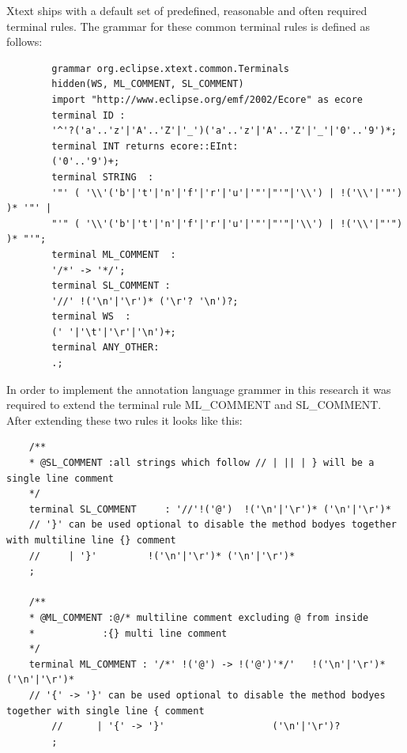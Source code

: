 Xtext ships with a default set of predefined, reasonable and often required terminal rules. The grammar for these common terminal rules is defined as follows:
	\begin{lstlisting}
		grammar org.eclipse.xtext.common.Terminals 
		hidden(WS, ML_COMMENT, SL_COMMENT)
		import "http://www.eclipse.org/emf/2002/Ecore" as ecore
		terminal ID : 
		'^'?('a'..'z'|'A'..'Z'|'_')('a'..'z'|'A'..'Z'|'_'|'0'..'9')*;
		terminal INT returns ecore::EInt: 
		('0'..'9')+;
		terminal STRING  : 
		'"' ( '\\'('b'|'t'|'n'|'f'|'r'|'u'|'"'|"'"|'\\') | !('\\'|'"') )* '"' |
		"'" ( '\\'('b'|'t'|'n'|'f'|'r'|'u'|'"'|"'"|'\\') | !('\\'|"'") )* "'"; 
		terminal ML_COMMENT  : 
		'/*' -> '*/';
		terminal SL_COMMENT : 
		'//' !('\n'|'\r')* ('\r'? '\n')?;
		terminal WS  : 
		(' '|'\t'|'\r'|'\n')+;
		terminal ANY_OTHER: 
		.;
	\end{lstlisting}

In order to implement the annotation language grammer in this research it was required to extend the terminal rule ML\_COMMENT and SL\_COMMENT. After extending these two rules it looks like this:

\begin{lstlisting}
	/**
	* @SL_COMMENT :all strings which follow // | || | } will be a single line comment
	*/ 
	terminal SL_COMMENT 	: '//'!('@')  !('\n'|'\r')* ('\n'|'\r')*
	// '}' can be used optional to disable the method bodyes together with multiline line {} comment 
	//     | '}'         !('\n'|'\r')* ('\n'|'\r')*               
	;
	
	/**
	* @ML_COMMENT :@/* multiline comment excluding @ from inside
	*            :{} multi line comment 
	*/ 
	terminal ML_COMMENT	: '/*' !('@') -> !('@')'*/'   !('\n'|'\r')* ('\n'|'\r')*   
	// '{' -> '}' can be used optional to disable the method bodyes together with single line { comment 
		//      | '{' -> '}'                   ('\n'|'\r')?
		;   
\end{lstlisting}

